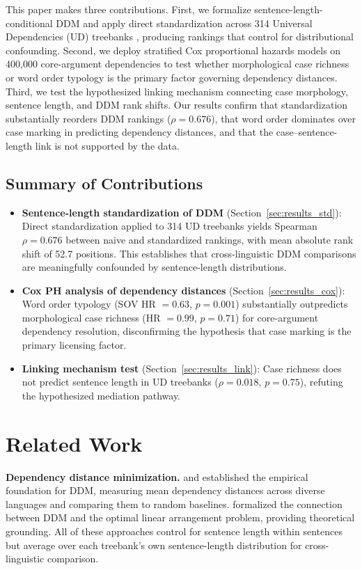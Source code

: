 \documentclass[11pt,letterpaper]{article}
\begin{document}
This paper makes three contributions. First, we formalize sentence-length-conditional DDM and apply direct standardization across 314 Universal Dependencies (UD) treebanks \citep{Nivre2020, Nivre2021}, producing rankings that control for distributional confounding. Second, we deploy stratified Cox proportional hazards models on 400,000 core-argument dependencies to test whether morphological case richness or word order typology is the primary factor governing dependency distances. Third, we test the hypothesized linking mechanism connecting case morphology, sentence length, and DDM rank shifts. Our results confirm that standardization substantially reorders DDM rankings ($\rho = 0.676$), that word order dominates over case marking in predicting dependency distances, and that the case--sentence-length link is not supported by the data.

\subsection{Summary of Contributions}

\begin{itemize}
  \item \textbf{Sentence-length standardization of DDM} (Section~\ref{sec:results_std}): Direct standardization applied to 314 UD treebanks yields Spearman $\rho = 0.676$ between naive and standardized rankings, with mean absolute rank shift of 52.7 positions. This establishes that cross-linguistic DDM comparisons are meaningfully confounded by sentence-length distributions.
  \item \textbf{Cox PH analysis of dependency distances} (Section~\ref{sec:results_cox}): Word order typology (SOV HR $= 0.63$, $p = 0.001$) substantially outpredicts morphological case richness (HR $= 0.99$, $p = 0.71$) for core-argument dependency resolution, disconfirming the hypothesis that case marking is the primary licensing factor.
  \item \textbf{Linking mechanism test} (Section~\ref{sec:results_link}): Case richness does not predict sentence length in UD treebanks ($\rho = 0.018$, $p = 0.75$), refuting the hypothesized mediation pathway.
\end{itemize}

\section{Related Work}

\textbf{Dependency distance minimization.} \citet{Liu2017} and \citet{Futrell2015} established the empirical foundation for DDM, measuring mean dependency distances across diverse languages and comparing them to random baselines. \citet{Temperley2018} formalized the connection between DDM and the optimal linear arrangement problem, providing theoretical grounding. All of these approaches control for sentence length within sentences but average over each treebank's own sentence-length distribution for cross-linguistic comparison.
\end{document}
